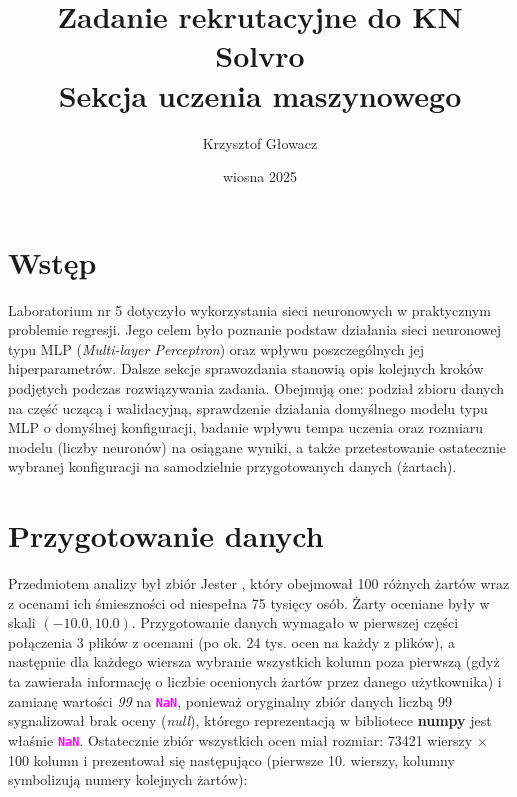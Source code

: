 \documentclass{article}
\title{%
    Zadanie rekrutacyjne do KN Solvro\\
    \large{Sekcja uczenia maszynowego}
}
\author{Krzysztof Głowacz}
\date{wiosna 2025}
\newcommand{\code}[1]{\textcolor{Fuchsia}{\textbf{\texttt{#1}}}}
\begin{document}
\maketitle
\tableofcontents
\clearpage

\section{Wstęp}
    Laboratorium nr 5 dotyczyło wykorzystania sieci neuronowych w praktycznym problemie regresji. Jego celem było poznanie podstaw działania sieci neuronowej typu MLP (\textit{Multi-layer Perceptron}) oraz wpływu poszczególnych jej hiperparametrów. Dalsze sekcje sprawozdania stanowią opis kolejnych kroków podjętych podczas rozwiązywania zadania. Obejmują one: podział zbioru danych na część uczącą i walidacyjną, sprawdzenie działania domyślnego modelu typu MLP o domyślnej konfiguracji, badanie wpływu tempa uczenia oraz rozmiaru modelu (liczby neuronów) na osiągane wyniki, a także przetestowanie ostatecznie wybranej konfiguracji na samodzielnie przygotowanych danych (żartach).

\section{Przygotowanie danych}
Przedmiotem analizy był zbiór Jester \cite{Jester}, który obejmował 100 różnych żartów wraz z ocenami ich śmieszności od niespełna 75 tysięcy osób. Żarty oceniane były w skali $(-10.0, 10.0)$. Przygotowanie danych wymagało w pierwszej części połączenia 3 plików z ocenami (po ok. 24 tys. ocen na każdy z plików), a następnie dla każdego wiersza wybranie wszystkich kolumn poza pierwszą (gdyż ta zawierała informację o liczbie ocenionych żartów przez danego użytkownika) i zamianę wartości \textit{99} na \code{NaN}, ponieważ oryginalny zbiór danych liczbą 99 sygnalizował brak oceny (\textit{null}), którego reprezentacją w bibliotece \textbf{numpy} jest właśnie \code{NaN}. Ostatecznie zbiór wszystkich ocen miał rozmiar: 73421 wierszy $\times$ 100 kolumn i prezentował się następująco (pierwsze 10. wierszy, kolumny symbolizują numery kolejnych żartów):
\end{document}
